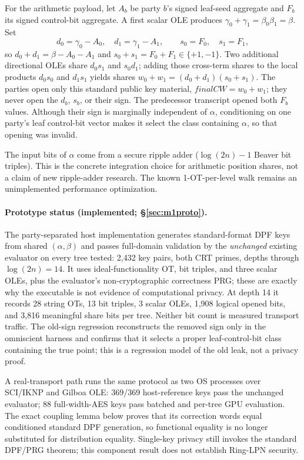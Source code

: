 \documentclass[11pt]{article}
\begin{document}
For the arithmetic payload, let $A_b$ be party $b$'s signed leaf-seed
aggregate and $F_b$ its signed control-bit aggregate. A first scalar OLE
produces $\gamma_0+\gamma_1=\beta_0\beta_1=\beta$. Set
\[
d_0=\gamma_0-A_0,\quad d_1=\gamma_1-A_1,\qquad
s_0=F_0,\quad s_1=F_1,
\]
so $d_0+d_1=\beta-A_0-A_1$ and
$s_0+s_1=F_0+F_1\in\{+1,-1\}$. Two additional directional OLEs share
$d_0s_1$ and $s_0d_1$; adding those cross-term shares to the local products
$d_0s_0$ and $d_1s_1$ yields shares
$w_0+w_1=(d_0+d_1)(s_0+s_1)$. The parties open only this standard public
key material, $\mathit{finalCW}=w_0+w_1$; they never open the $d_b$, $s_b$,
or their sign. The predecessor transcript opened both $F_b$ values. Although
their sign is marginally independent of $\alpha$, conditioning on one
party's leaf control-bit vector makes it select the class containing
$\alpha$, so that opening was invalid.

The input bits of $\alpha$ come from a secure ripple adder
($\log(2n)-1$ Beaver bit triples). This is the concrete integration choice
for arithmetic position shares, not a claim of new ripple-adder research.
The known 1-OT-per-level walk remains an unimplemented performance
optimization.

\paragraph{Prototype status (implemented; \S\ref{sec:m1proto}).} The
party-separated host implementation generates standard-format DPF keys from
shared $(\alpha,\beta)$ and passes full-domain validation by the
\emph{unchanged} existing evaluator on every tree tested: 2{,}432 key pairs,
both CRT primes, depths through $\log(2n)=14$. It uses ideal-functionality
OT, bit triples, and three scalar OLEs, plus the evaluator's non-cryptographic
correctness PRG; these are exactly why the executable is not evidence of
computational privacy. At depth 14 it records 28 string OTs, 13 bit triples,
3 scalar OLEs, 1{,}908 logical opened bits, and 3{,}816 meaningful share bits
per tree. Neither bit count is measured transport traffic. The old-sign
regression reconstructs the removed sign only in the omniscient harness and
confirms that it selects a proper leaf-control-bit class containing the true
point; this is a regression model of the old leak, not a privacy proof.

A real-transport path runs the same protocol as two OS processes over SCI/IKNP
and Gilboa OLE: 369/369 host-reference keys pass the unchanged evaluator;
88 full-width-AES keys pass batched and per-tree GPU evaluation. The exact
coupling lemma below proves that its correction words equal conditioned
standard DPF generation, so functional equality is no longer substituted for
distribution equality. Single-key privacy still invokes the standard DPF/PRG
theorem; this component result does not establish Ring-LPN security.
\end{document}
